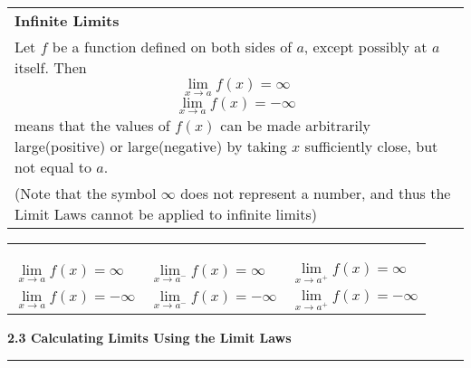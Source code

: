 \documentclass[fleqn]{article}
\begin{document}
\begin{center}
\def\arraystretch{1.3}
{\setlength{\tabcolsep}{16pt}
\begin{tabularx}{.9\textwidth}{|X|}
\hline
	\vspace{1pt}
	\textbf{Infinite Limits} \\
	Let $f$ be a function defined on both sides of $a$, except possibly at $a$ itself. Then
	$$\underset{x \to a}{\lim} f(x) = \infty$$
	$$\underset{x \to a}{\lim} f(x) = -\infty$$
	means that the values of $f(x)$ can be made arbitrarily large(positive) or large(negative) by taking $x$ sufficiently close, but not equal to $a$. \\[5pt]
	(Note that the symbol $\infty$ does not represent a number, and thus the Limit Laws cannot be applied to infinite limits)\\[16pt]
\hline
\end{tabularx}}
\vspace{12pt}

\def\arraystretch{1.3}
{\setlength{\tabcolsep}{16pt}
\begin{tabularx}{.9\textwidth}{|>{\centering}X >{\centering}X >{\centering\arraybackslash}X|}
\hline
	\vspace{1pt} 
	\pbox{20cm}{\textbf{Vertical Asymptotes}} & & \\
	\multicolumn{3}{|>{\hsize=\dimexpr3\hsize+4\tabcolsep+2\arrayrulewidth\relax}X|}{\vspace{-5pt}The line $x=a$ is called a \textbf{vertical asymptote} of the curve $y=f(x)$ if at least one of the following statements is true:} \\
	\vspace{-12pt} & \vspace{-12pt} & \vspace{-12pt}\\[-12pt]
	$\underset{x \to a}{\lim} f(x) = \infty$ & $\underset{x \to a^-}{\lim} f(x) = \infty$ & $\underset{x \to a^+}{\lim} f(x) = \infty$ \\[12pt]
	$\underset{x \to a}{\lim} f(x) = -\infty$ & $\underset{x \to a^-}{\lim} f(x) = -\infty$ & $\underset{x \to a^+}{\lim} f(x) = -\infty$ \\[16pt]	
\hline
\end{tabularx}}
\vspace{32pt}

\Large\textbf{2.3 Calculating Limits Using the Limit Laws}

\noindent\hfill\rule{0.3\textwidth}{.4pt}\hfill
\vspace{12pt}


\end{center}
\end{document}
